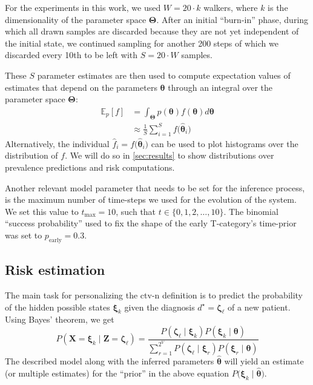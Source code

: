 \documentclass[twocolumn]{aastex631}
\begin{document}
For the experiments in this work, we used $W = 20 \cdot k$ walkers, where $k$ is the dimensionality of the parameter space $\boldsymbol{\Theta}$. After an initial ``burn-in'' phase, during which all drawn samples are discarded because they are not yet independent of the initial state, we continued sampling for another 200 steps of which we discarded every 10th to be left with $S = 20 \cdot W$ samples.

These $S$ parameter estimates are then used to compute expectation values of estimates that depend on the parameters $\boldsymbol{\theta}$ through an integral over the parameter space $\boldsymbol{\Theta}$:
%
\begin{equation}
    \begin{aligned}
        \mathbb{E}_p \left[ f \right] &= \int_{\boldsymbol{\Theta}} p(\boldsymbol{\theta}) f(\boldsymbol{\theta}) d\boldsymbol{\theta} \\
        &\approx \frac{1}{S} \sum_{i=1}^S f \big( \boldsymbol{\hat{\theta}}_i \big)
    \end{aligned}
\end{equation}
%
Alternatively, the individual $\hat{f}_i = f\big( \boldsymbol{\hat{\theta}}_i \big)$ can be used to plot histograms over the distribution of $f$. We will do so in \cref{sec:results} to show distributions over prevalence predictions and risk computations.

Another relevant model parameter that needs to be set for the inference process, is the maximum number of time-steps we used for the evolution of the system. We set this value to $t_\text{max} = 10$, such that $t \in \{ 0, 1, 2, \ldots, 10 \}$. The binomial ``success probability'' used to fix the shape of the early T-category's time-prior was set to $p_\text{early} = 0.3$.


\subsection{Risk estimation}
\label{subsec:formalism:risk}

The main task for personalizing the \gls{ctv-n} definition is to predict the probability of the hidden possible states $\boldsymbol{\xi}_k$ given the diagnosis $d^\star=\boldsymbol{\zeta}_\ell$ of a new patient. Using Bayes' theorem, we get
%
\begin{equation}
    P\left( \mathbf{X}=\boldsymbol{\xi}_k \mid \mathbf{Z}=\boldsymbol{\zeta}_\ell \right) = \frac{P\left( \boldsymbol{\zeta}_\ell \mid \boldsymbol{\xi}_k \right) P\left( \boldsymbol{\xi}_k \mid \boldsymbol{\theta} \right)}{\sum_{r=1}^{2^V} P\left( \boldsymbol{\zeta}_\ell \mid \boldsymbol{\xi}_r \right) P\left( \boldsymbol{\xi}_r \mid \boldsymbol{\theta} \right) }
\end{equation}
%
The described model along with the inferred parameters $\boldsymbol{\hat{\theta}}$ will yield an estimate (or multiple estimates) for the ``prior'' in the above equation $P\big( \boldsymbol{\xi}_k \mid \boldsymbol{\hat{\theta}} \big)$.
\end{document}
